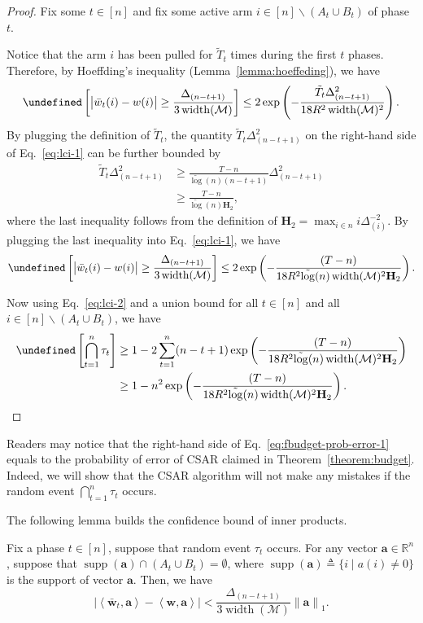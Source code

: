 \documentclass{article}
\newcommand{\AlgorithmBud}{{\small \textsf{CSAR}}\xspace}
\newcommand{\M}{\mathcal M}
\newcommand{\del}{\backslash}
\newcommand{\RR}{\mathbb R}
\DeclareMathOperator{\supp}{supp}
\DeclareMathOperator{\rank}{width}
\newcommand{\barlog}{\tilde{\log}}
\let\Pr\undefined
\DeclareMathOperator{\Pr}{Pr}
\newcommand{\inn}[1]{\left\langle #1 \right\rangle}
\newcommand{\nor}[1]{\left\|#1\right\|}
\renewcommand{\vec}[1]{\boldsymbol{#1}}
\begin{document}
\begin{proof}
Fix some $t\in [n]$ and fix some active arm $i\in [n]\del (A_t\cup B_t)$ of phase $t$.

Notice that the arm $i$ has been pulled for $\tilde T_t$ times during the first $t$ phases.
Therefore,
by Hoeffding's inequality (Lemma~\ref{lemma:hoeffeding}), we have
\begin{align}
	\Pr\left[ \big|\bar w_t(i)-w(i)\big| \ge \frac{\Delta_{(n-t+1)}}{3\rank(\M)} \right] \le
	2\exp\left(-\frac{\tilde T_t \Delta_{(n-t+1)}^2}{18 R^2\rank(\M)^2} \right).
	\label{eq:lci-1}
\end{align}
By plugging the definition of $\tilde T_t$, the quantity $\tilde T_t\Delta_{(n-t+1)}^2$ on the right-hand side of Eq.~\eqref{eq:lci-1} can be further bounded by
\begin{align*}
\tilde T_t\Delta_{(n-t+1)}^2 
&\ge \frac{T-n}{\barlog(n)(n-t+1)}\Delta_{(n-t+1)}^2\\
&\ge \frac{T-n}{\barlog(n) \mathbf H_2},
\end{align*}
where the last inequality follows from the definition of $\mathbf H_2=\max_{i\in n} i\Delta_{(i)}^{-2}$.
By plugging the last inequality into Eq.~\eqref{eq:lci-1}, we have
\begin{equation}
\label{eq:lci-2}
	\Pr\left[ \big|\bar w_t(i)-w(i)\big| \ge \frac{\Delta_{(n-t+1)}}{3\rank(\M)} \right] \le
	2\exp\left(-\frac{(T-n)}{18 R^2 \barlog(n) \rank(\M)^2 \mathbf H_2} \right).
\end{equation}

Now using Eq.~\eqref{eq:lci-2} and a union bound for all $t \in [n]$ and all $i\in[n]\del (A_t\cup B_t)$, we have
\begin{align*}
\Pr\left[\bigcap_{t=1}^n \tau_t\right] &
\ge 1-2\sum_{t=1}^n (n-t+1)\exp\left(-\frac{(T-n)}{18 R^2 \barlog(n) \rank(\M)^2 \mathbf H_2} \right)\\
&\ge 1-n^2  \exp\left(-\frac{(T-n)}{18 R^2 \barlog(n) \rank(\M)^2 \mathbf H_2} \right).
\end{align*}
\end{proof}

Readers may notice that the right-hand side of Eq.~\eqref{eq:fbudget-prob-error-1} equals to the probability of error of \AlgorithmBud claimed in Theorem~\ref{theorem:budget}. 
Indeed, we will show that the \AlgorithmBud algorithm will not make any mistakes if the random event $\bigcap_{t=1}^n \tau_t$ occurs.

The following lemma builds the confidence bound of inner products.
\begin{lemma}
Fix a phase $t\in[n]$, suppose that random event $\tau_t$ occurs.
For any vector $\vec a \in \RR^n$, suppose that $\supp(\vec a) \cap (A_t\cup B_t) = \emptyset$, where 
$\supp(\vec a) \triangleq \{i\;|\; a(i) \not=0\}$ is the support of vector $\vec a$.
Then, we have
$$
\left| \inn{\vec{\bar w}_t, \vec a} - \inn{\vec w, \vec a} \right|
< \frac{\Delta_{(n-t+1)}}{3\rank(\M)} \nor{\vec a}_1.
$$
\label{lemma:fbudget:ciproerty}
\end{lemma}
\end{document}
